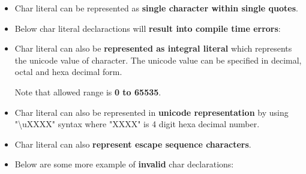 
\begin{flushleft}
	\begin{itemize}		
		\item Char literal can be represented as \textbf{single character within single quotes}.

		\item Below char literal declaractions will \textbf{result into compile time errors}:
		

		\item Char literal can also be \textbf{represented as integral literal} which represents the unicode value of character.
		\newline
		The unicode value can be specified in decimal, octal and hexa decimal form.

		Note that allowed range is \textbf{0 to 65535}.
		
		\bigskip
		\item Char literal can also be represented in \textbf{unicode representation} by using "\textbackslash uXXXX" syntax where "XXXX" is 4 digit hexa decimal number.
		
		
		\newpage
		
		\item Char literal can also \textbf{represent escape sequence characters}.

		\item Below are some more example of \textbf{invalid} char declarations:
		
	\end{itemize}
	

\end{flushleft}

\newpage

